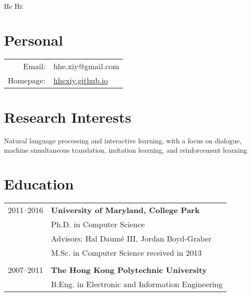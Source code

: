 \documentclass[a4paper,11pt]{article}
\begin{document}
\pagestyle{empty} %

\par{\centering
        {\Huge He \textsc{He}
    }\bigskip\par}

\section{Personal}

\begin{tabular}{rl}
    Email:     & hhe.xiy@gmail.com \\
	Homepage:  & \url{hhexiy.github.io}	
\end{tabular}

\section{Research Interests}
Natural language processing and interactive learning,
with a focus on
dialogue, machine simultaneous translation, imitation learning, and reinforcement learning

\section{Education}
\begin{tabular}{rl}    
2011--2016 & \textbf{University of Maryland, College Park}\\
& Ph.D. in Computer Science \\
& Advisors: Hal Daum\'e III, Jordan Boyd-Graber \\
& M.Sc. in Computer Science received in 2013 \\
\\
2007--2011 & \textbf{The Hong Kong Polytechnic University}\\
& B.Eng. in Electronic and Information Engineering
\end{tabular}
\end{document}
